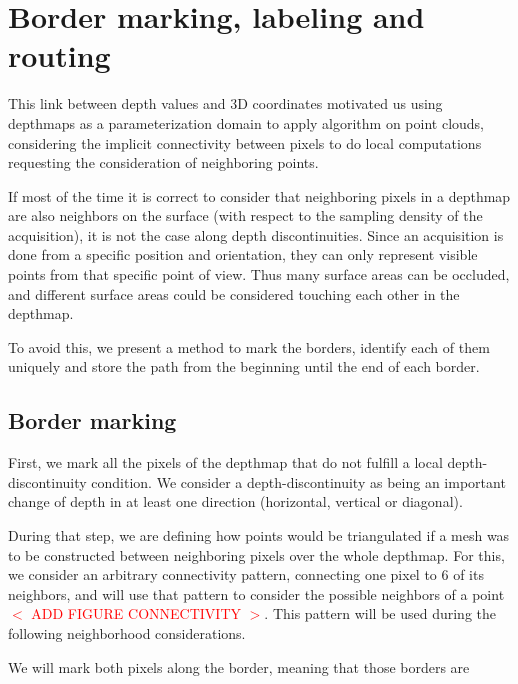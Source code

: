 \documentclass[11pt,fleqn]{book} %
\newcommand{\arnaud}[1]{\textcolor{red}{$<$ #1 $>$}}
\begin{document}
\section{Border marking, labeling and routing}
\label{sec:border_marking}

This link between depth values and 3D coordinates motivated us using depthmaps as a parameterization domain to apply algorithm on point clouds, considering the implicit connectivity between pixels to do local computations requesting the consideration of neighboring points.

If most of the time it is correct to consider that neighboring pixels in a depthmap are also neighbors on the surface (with respect to the sampling density of the acquisition), it is not the case along depth discontinuities.
Since an acquisition is done from a specific position and orientation, they can only represent visible points from that specific point of view. Thus many surface areas can be occluded, and different surface areas could be considered touching each other in the depthmap.

To avoid this, we present a method to mark the borders, identify each of them uniquely and store the path from the beginning until the end of each border.

\subsection{Border marking}
First, we mark all the pixels of the depthmap that do not fulfill a local depth-discontinuity condition. We consider a depth-discontinuity as being an important change of depth in at least one direction (horizontal, vertical or diagonal).

During that step, we are defining how points would be triangulated if a mesh was to be constructed between neighboring pixels over the whole depthmap. For this, we consider an arbitrary connectivity pattern, connecting one pixel to 6 of its neighbors, and will use that pattern to consider the possible neighbors of a point \arnaud{ADD FIGURE CONNECTIVITY}. This pattern will be used during the following neighborhood considerations.

We will mark both pixels along the border, meaning that those borders are 
\end{document}
